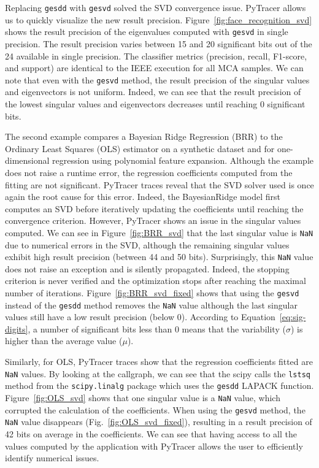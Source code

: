 \documentclass[10pt,journal,compsoc]{IEEEtran}
\newcommand{\pytracer}[0]{PyTracer\xspace}
\begin{document}
Replacing \texttt{gesdd} with \texttt{gesvd} solved the SVD convergence
issue. \pytracer allows us to quickly visualize the new result precision.
Figure~\ref{fig:face_recognition_svd} shows the result precision of the
eigenvalues computed with \texttt{gesvd} in single precision. The result
precision varies between 15 and 20 significant bits out of the 24 available in
single precision. The classifier metrics (precision, recall, F1-score, and
support) are identical to the IEEE execution for all MCA samples. We can note
that even with the \texttt{gesvd} method, the result precision of the singular
values and eigenvectors is not uniform. Indeed, we can see that the result
precision of the lowest singular values and eigenvectors decreases until
reaching 0 significant bits.

The second example compares a Bayesian Ridge Regression (BRR) to the Ordinary
Least Squares (OLS) estimator on a synthetic dataset and for one-dimensional
regression using polynomial feature expansion. Although the example does not
raise a runtime error, the regression coefficients computed from the fitting are
not significant. \pytracer traces reveal that the SVD solver used is once again
the root cause for this error. Indeed, the BayesianRidge model first computes an
SVD before iteratively updating the coefficients until reaching the convergence
criterion. However, PyTracer shows an issue in the singular values computed. We
can see in Figure~\ref{fig:BRR_svd} that the last singular value is \texttt{NaN}
due to numerical errors in the SVD, although the remaining singular values
exhibit high result precision (between 44 and 50 bits). Surprisingly, this
\texttt{NaN} value does not raise an exception and is silently propagated.
Indeed, the stopping criterion is never verified and the optimization stops
after reaching the maximal number of iterations. Figure~\ref{fig:BRR_svd_fixed}
shows that using the \texttt{gesvd} instead of the \texttt{gesdd} method removes
the \texttt{NaN} value although the last singular values still have a low result
precision (below 0). According to Equation~\ref{eq:sig-digits}, a number of
significant bits less than 0 means that the variability ($\sigma$) is higher
than the average value ($\mu$).

Similarly, for OLS, PyTracer traces show that the regression coefficients fitted
are \texttt{NaN} values. By looking at the callgraph, we can see that the scipy
calls the \texttt{lstsq} method from the \texttt{scipy.linalg} package which
uses the \texttt{gesdd} LAPACK function. Figure~\ref{fig:OLS_svd} shows that one
singular value is a \texttt{NaN} value, which corrupted the calculation of the
coefficients. When using the \texttt{gesvd} method, the \texttt{NaN} value
disappears (Fig.~\ref{fig:OLS_svd_fixed}), resulting in a result precision of 42
bits on average in the coefficients. We can see that having access to all the
values computed by the application with PyTracer allows the user to efficiently
identify numerical issues.
\end{document}
